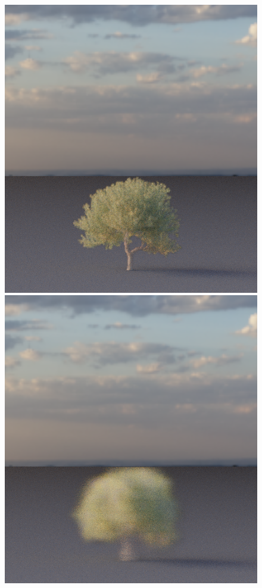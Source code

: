 \begin{figure}[t]
\begin{center}
\begin{minipage}[c]{0.24\textwidth}
            \includegraphics[valign=c, width=\linewidth]{img/OC41_9_0.1.png}
        \end{minipage}
        \begin{minipage}[c]{0.24\textwidth}
            \includegraphics[valign=c, width=\linewidth]{img/OC41_9_0.8.png}
        \end{minipage}
    

\end{center}
\end{figure}
